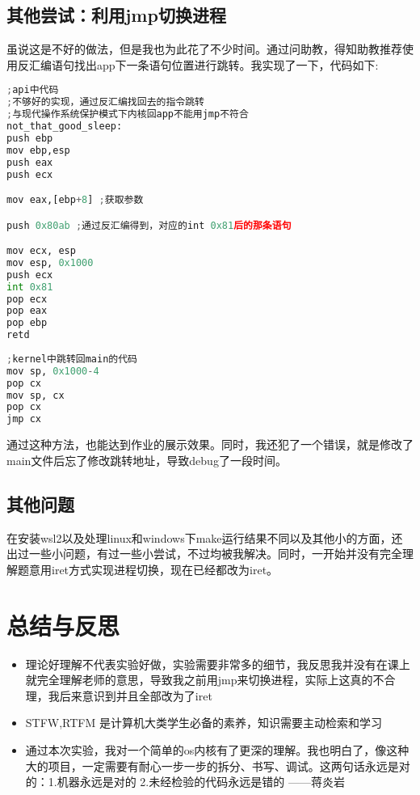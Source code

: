 \documentclass{LabReport}
\begin{document}
	\subsection{其他尝试：利用jmp切换进程}
	虽说这是不好的做法，但是我也为此花了不少时间。通过问助教，得知助教推荐使用反汇编语句找出app下一条语句位置进行跳转。我实现了一下，代码如下:
	\begin{lstlisting}[language=python,frame=shadowbox]
;api中代码
;不够好的实现，通过反汇编找回去的指令跳转
;与现代操作系统保护模式下内核回app不能用jmp不符合
not_that_good_sleep:
push ebp
mov ebp,esp
push eax
push ecx

mov eax,[ebp+8] ;获取参数

push 0x80ab ;通过反汇编得到，对应的int 0x81后的那条语句

mov ecx, esp
mov esp, 0x1000
push ecx
int 0x81
pop ecx
pop eax
pop ebp
retd
		
;kernel中跳转回main的代码	
mov sp, 0x1000-4
pop cx
mov sp, cx
pop cx
jmp cx
	\end{lstlisting}
	通过这种方法，也能达到作业的展示效果。同时，我还犯了一个错误，就是修改了main文件后忘了修改跳转地址，导致debug了一段时间。
	
	\subsection{其他问题}
	在安装wsl2以及处理linux和windows下make运行结果不同以及其他小的方面，还出过一些小问题，有过一些小尝试，不过均被我解决。同时，一开始并没有完全理解题意用iret方式实现进程切换，现在已经都改为iret。
	
	\section{总结与反思}
	\begin{itemize}
		\item 理论好理解不代表实验好做，实验需要非常多的细节，我反思我并没有在课上就完全理解老师的意思，导致我之前用jmp来切换进程，实际上这真的不合理，我后来意识到并且全部改为了iret
		\item STFW,RTFM 是计算机大类学生必备的素养，知识需要主动检索和学习
		\item 通过本次实验，我对一个简单的os内核有了更深的理解。我也明白了，像这种大的项目，一定需要有耐心一步一步的拆分、书写、调试。这两句话永远是对的：1.机器永远是对的 2.未经检验的代码永远是错的 ——蒋炎岩
	\end{itemize}
\end{document}
